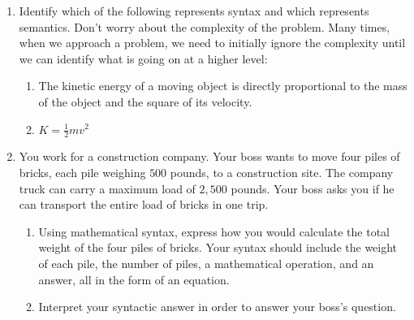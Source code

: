 \documentclass[letterpaper,12pt,fleqn]{article}
\begin{document}
\begin{enumerate}
\item Identify which of the following represents syntax and which represents semantics.
  Don't worry about the complexity of the problem. Many times, when we approach a
  problem, we need to initially ignore the complexity until we can identify what is
  going on at a higher level:
  \begin{enumerate}
  \item The kinetic energy of a moving object is directly proportional to the mass
    of the object and the square of its velocity.

    \vspace{0.5in}
    
  \item $K=\frac{1}{2}mv^2$

    \vspace{0.5in}
  \end{enumerate}

\item You work for a construction company. Your boss wants to move four piles of
  bricks, each pile weighing $500$ pounds, to a construction site. The company truck can
  carry a maximum load of $2,500$ pounds. Your boss asks you if he can transport the
  entire load of bricks in one trip.
  \begin{enumerate}
  \item Using mathematical syntax, express how you would calculate the total weight
    of the four piles of bricks. Your syntax should include the weight of each pile, the
    number of piles, a mathematical operation, and an answer, all in the form of an
    equation.

    \vspace{1in}
    
  \item Interpret your syntactic answer in order to answer your boss's question.
  \end{enumerate}
\end{enumerate}
\end{document}

